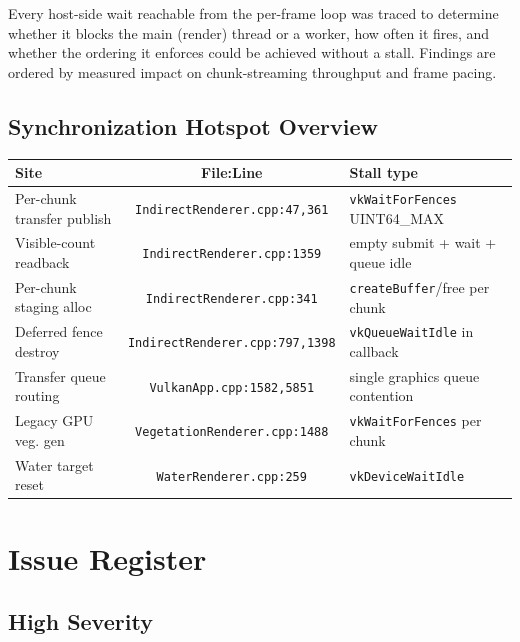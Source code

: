 \documentclass[a4paper,12pt]{article}
\begin{document}
Every host-side wait reachable from the per-frame loop was traced to determine
whether it blocks the main (render) thread or a worker, how often it fires, and
whether the ordering it enforces could be achieved without a stall. Findings are
ordered by measured impact on chunk-streaming throughput and frame pacing.

\subsection*{Synchronization Hotspot Overview}

\begin{center}
\begin{tabular}{lcl}
\toprule
\textbf{Site} & \textbf{File:Line} & \textbf{Stall type} \\
\midrule
Per-chunk transfer publish   & \texttt{IndirectRenderer.cpp:47,361}  & \texttt{vkWaitForFences} UINT64\_MAX \\
Visible-count readback       & \texttt{IndirectRenderer.cpp:1359}    & empty submit + wait + queue idle \\
Per-chunk staging alloc      & \texttt{IndirectRenderer.cpp:341}     & \texttt{createBuffer}/free per chunk \\
Deferred fence destroy       & \texttt{IndirectRenderer.cpp:797,1398}& \texttt{vkQueueWaitIdle} in callback \\
Transfer queue routing       & \texttt{VulkanApp.cpp:1582,5851}      & single graphics queue contention \\
Legacy GPU veg. gen          & \texttt{VegetationRenderer.cpp:1488}  & \texttt{vkWaitForFences} per chunk \\
Water target reset           & \texttt{WaterRenderer.cpp:259}        & \texttt{vkDeviceWaitIdle} \\
\bottomrule
\end{tabular}
\end{center}

\newpage

\section{Issue Register}

\subsection{High Severity}
\end{document}
